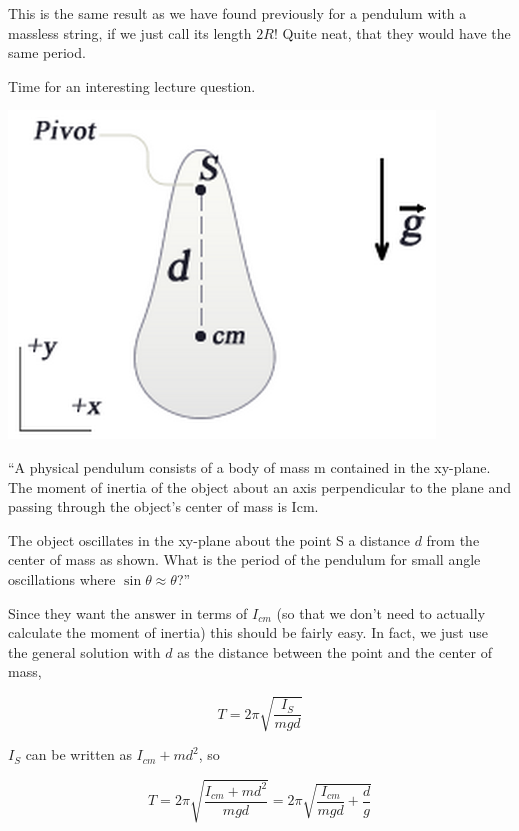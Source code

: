 \documentclass[12pt,a4paper]{report}
\begin{document}
This is the same result as we have found previously for a pendulum with a massless string, if we just call its length $2 R$! Quite neat, that they would have the same period.	

Time for an interesting lecture question.

\begin{center}
\includegraphics[scale=0.5]{Graphics/lec21_physical_pendulum_2}
\end{center}

``A physical pendulum consists of a body of mass m contained in the xy-plane. The moment of inertia of the object about an axis perpendicular to the plane and passing through the object's center of mass is Icm.

The object oscillates in the xy-plane about the point S a distance $d$ from the center of mass as shown. What is the period of the pendulum for small angle oscillations where $\sin\theta \approx \theta$?''

Since they want the answer in terms of $I_{cm}$ (so that we don't need to actually calculate the moment of inertia) this should be fairly easy. In fact, we just use the general solution with $d$ as the distance between the point and the center of mass,

\begin{equation}
T = 2 \pi \sqrt{\frac{I_{S}}{m g d}}
\end{equation}

$I_S$ can be written as $I_{cm} + m d^2$, so

\begin{equation}
T = 2 \pi \sqrt{\frac{I_{cm} + m d^2}{m g d}} = 2 \pi \sqrt{\frac{I_{cm}}{m g d} + \frac{d}{g}}
\end{equation}
\end{document}
